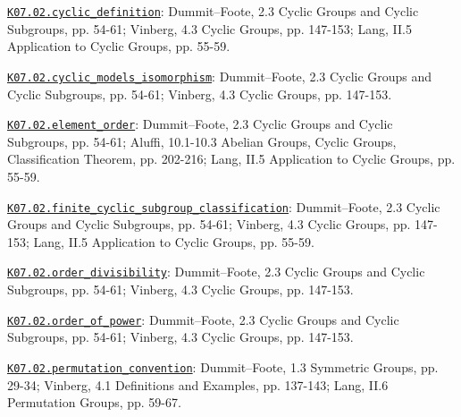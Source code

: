 \par\smallskip\noindent\hypertarget{src:K07.02.cyclic_definition}{}\label{src:K07.02.cyclic_definition}\hyperref[K07.02.cyclic_definition]{\texttt{K07.02.cyclic\_definition}}: Dummit--Foote, 2.3 Cyclic Groups and Cyclic Subgroups, pp. 54-61; Vinberg, 4.3 Cyclic Groups, pp. 147-153; Lang, II.5 Application to Cyclic Groups, pp. 55-59.
\par\smallskip\noindent\hypertarget{src:K07.02.cyclic_models_isomorphism}{}\label{src:K07.02.cyclic_models_isomorphism}\hyperref[K07.02.cyclic_models_isomorphism]{\texttt{K07.02.cyclic\_models\_isomorphism}}: Dummit--Foote, 2.3 Cyclic Groups and Cyclic Subgroups, pp. 54-61; Vinberg, 4.3 Cyclic Groups, pp. 147-153.
\par\smallskip\noindent\hypertarget{src:K07.02.element_order}{}\label{src:K07.02.element_order}\hyperref[K07.02.element_order]{\texttt{K07.02.element\_order}}: Dummit--Foote, 2.3 Cyclic Groups and Cyclic Subgroups, pp. 54-61; Aluffi, 10.1-10.3 Abelian Groups, Cyclic Groups, Classification Theorem, pp. 202-216; Lang, II.5 Application to Cyclic Groups, pp. 55-59.
\par\smallskip\noindent\hypertarget{src:K07.02.finite_cyclic_subgroup_classification}{}\label{src:K07.02.finite_cyclic_subgroup_classification}\hyperref[K07.02.finite_cyclic_subgroup_classification]{\texttt{K07.02.finite\_cyclic\_subgroup\_classification}}: Dummit--Foote, 2.3 Cyclic Groups and Cyclic Subgroups, pp. 54-61; Vinberg, 4.3 Cyclic Groups, pp. 147-153; Lang, II.5 Application to Cyclic Groups, pp. 55-59.
\par\smallskip\noindent\hypertarget{src:K07.02.order_divisibility}{}\label{src:K07.02.order_divisibility}\hyperref[K07.02.order_divisibility]{\texttt{K07.02.order\_divisibility}}: Dummit--Foote, 2.3 Cyclic Groups and Cyclic Subgroups, pp. 54-61; Vinberg, 4.3 Cyclic Groups, pp. 147-153.
\par\smallskip\noindent\hypertarget{src:K07.02.order_of_power}{}\label{src:K07.02.order_of_power}\hyperref[K07.02.order_of_power]{\texttt{K07.02.order\_of\_power}}: Dummit--Foote, 2.3 Cyclic Groups and Cyclic Subgroups, pp. 54-61; Vinberg, 4.3 Cyclic Groups, pp. 147-153.
\par\smallskip\noindent\hypertarget{src:K07.02.permutation_convention}{}\label{src:K07.02.permutation_convention}\hyperref[K07.02.permutation_convention]{\texttt{K07.02.permutation\_convention}}: Dummit--Foote, 1.3 Symmetric Groups, pp. 29-34; Vinberg, 4.1 Definitions and Examples, pp. 137-143; Lang, II.6 Permutation Groups, pp. 59-67.
